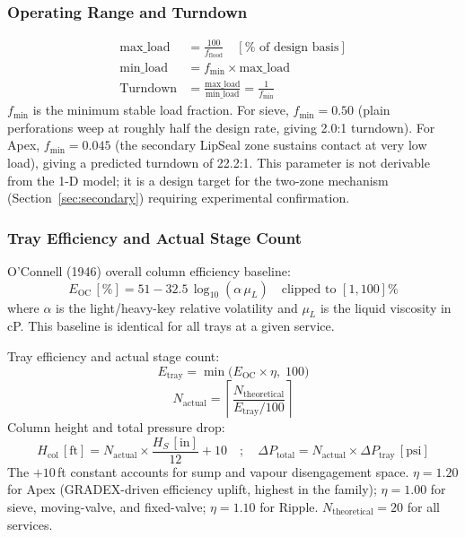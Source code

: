 \documentclass[11pt,letterpaper]{article}
\newcommand{\dpt}{\Delta P_{\mathrm{tray}}}
\newcommand{\dptot}{\Delta P_{\mathrm{total}}}
\newcommand{\eoc}{E_{\mathrm{OC}}}
\newcommand{\etray}{E_{\mathrm{tray}}}
\begin{document}
\subsubsection{Operating Range and Turndown}
\label{sec:turndown}

\begin{align}
  \mathrm{max\_load} &= \frac{100}{f_{\mathrm{flood}}} \quad [\%\text{ of design basis}]
  \label{eq:maxload}\\
  \mathrm{min\_load} &= f_{\mathrm{min}} \times \mathrm{max\_load}
  \label{eq:minload}\\
  \mathrm{Turndown} &= \frac{\mathrm{max\_load}}{\mathrm{min\_load}}
                     = \frac{1}{f_{\mathrm{min}}}
  \label{eq:turndown}
\end{align}
$f_{\mathrm{min}}$ is the minimum stable load fraction.  For sieve,
$f_{\mathrm{min}} = 0.50$ (plain perforations weep at roughly half the design
rate, giving 2.0:1 turndown).  For Apex, $f_{\mathrm{min}} = 0.045$ (the
secondary LipSeal zone sustains contact at very low load), giving a predicted
turndown of 22.2:1.  This parameter is not derivable from the 1-D model; it
is a design target for the two-zone mechanism (Section~\ref{sec:secondary})
requiring experimental confirmation.

\subsubsection{Tray Efficiency and Actual Stage Count}
\label{sec:efficiency}

O'Connell (1946) overall column efficiency baseline:
\begin{equation}
  \eoc\,[\%] = 51 - 32.5\,\log_{10}(\alpha\,\mu_L)
  \quad\text{clipped to }[1,100]\%
  \label{eq:eoconnell}
\end{equation}
where $\alpha$ is the light/heavy-key relative volatility and $\mu_L$ is the
liquid viscosity in cP.  This baseline is identical for all trays at a given
service.

Tray efficiency and actual stage count:
\begin{equation}
  \etray = \min\!\bigl(\eoc \times \eta,\; 100\bigr)
  \label{eq:etray}
\end{equation}
\begin{equation}
  N_{\mathrm{actual}} = \left\lceil \frac{N_{\mathrm{theoretical}}}{\etray/100} \right\rceil
  \label{eq:nactual}
\end{equation}
Column height and total pressure drop:
\begin{equation}
  H_{\mathrm{col}}\,[\mathrm{ft}] = N_{\mathrm{actual}} \times \frac{H_S\,[\mathrm{in}]}{12} + 10
  \quad;\quad
  \dptot = N_{\mathrm{actual}} \times \dpt\,[\mathrm{psi}]
  \label{eq:height}
\end{equation}
The $+10$\,ft constant accounts for sump and vapour disengagement space.
$\eta = 1.20$ for Apex (GRADEX-driven efficiency uplift, highest in the
family); $\eta = 1.00$ for sieve, moving-valve, and fixed-valve;
$\eta = 1.10$ for Ripple.  $N_{\mathrm{theoretical}} = 20$ for all services.
\end{document}
